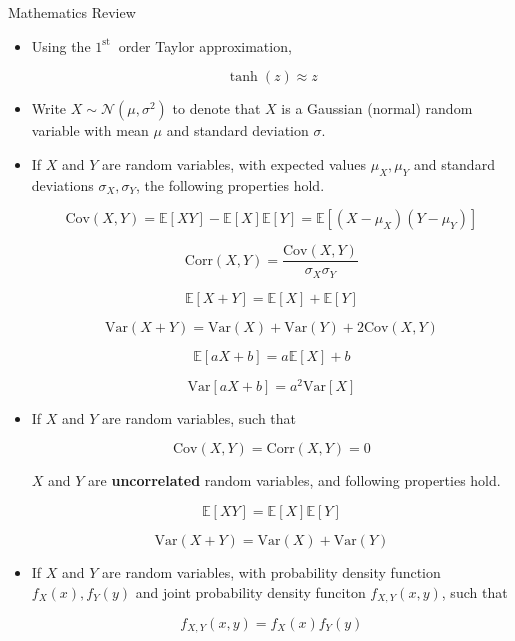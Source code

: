 \begin{frame}[allowframebreaks]

\begin{myconceptblock}{6.31}{Mathematics Review}
    \begin{itemize}
        \item
        Using the $1^{\text {st }}$ order Taylor approximation,

        $$
        \tanh (z) \approx z
        $$
        \item Write $X \sim \mathcal{N}\left(\mu, \sigma^{2}\right)$ to denote that $X$ is a Gaussian (normal) random variable with mean $\mu$ and standard deviation $\sigma$.
        \item
        If $X$ and $Y$ are random variables, with expected values $\mu_X, \mu_Y$ and standard deviations $\sigma_X, \sigma_Y$, the following properties hold.

        $$
        \text{Cov}(X, Y) = \mathbb{E}[XY] - \mathbb{E}[X]\mathbb{E}[Y] = \mathbb{E}[(X-\mu_X)(Y-\mu_Y)]
        $$

        $$
        \text{Corr}(X, Y) = \frac{\text{Cov}(X, Y)}{\sigma_X \sigma_Y}
        $$

        $$
        \mathbb{E}[X+Y] = \mathbb{E}[X] + \mathbb{E}[Y]
        $$

        $$
        \text{Var}(X+Y) = \text{Var}(X) + \text{Var}(Y) + 2\text{Cov}(X, Y)
        $$

        $$
        \mathbb{E}[aX+b] = a\mathbb{E}[X] + b
        $$

        $$
        \text{Var}[aX+b] = a^2 \text{Var}[X]
        $$
        \item
        If $X$ and $Y$ are random variables, such that

        $$
        \text{Cov}(X, Y)=\text{Corr}(X, Y)=0
        $$

        $X$ and $Y$ are \textbf{uncorrelated} random variables, and following properties hold.

        $$
        \mathbb{E}[XY] = \mathbb{E}[X] \mathbb{E}[Y]
        $$

        $$
        \text{Var}(X+Y) = \text{Var}(X) + \text{Var}(Y)
        $$
        \item
        If $X$ and $Y$ are random variables, with probability density function $f_X(x), f_Y(y)$ and joint probability density funciton $f_{X, Y}(x, y)$, such that

        $$
        f_{X, Y}(x, y) = f_X(x)f_Y(y)
        $$


\end{itemize}
\end{myconceptblock}
\end{frame}
